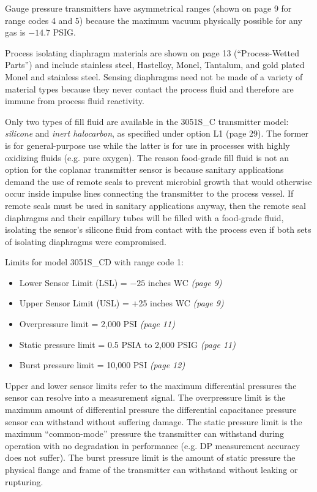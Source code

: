 \vskip 10pt

Gauge pressure transmitters have asymmetrical ranges (shown on page 9 for range codes 4 and 5) because the maximum vacuum physically possible for any gas is $-14.7$ PSIG.

\vskip 10pt

Process isolating diaphragm materials are shown on page 13 (``Process-Wetted Parts'') and include stainless steel, Hastelloy, Monel, Tantalum, and gold plated Monel and stainless steel.  Sensing diaphragms need not be made of a variety of material types because they never contact the process fluid and therefore are immune from process fluid reactivity.

\vskip 10pt

Only two types of fill fluid are available in the 3051S\_C transmitter model: {\it silicone} and {\it inert halocarbon}, as specified under option L1 (page 29).  The former is for general-purpose use while the latter is for use in processes with highly oxidizing fluids (e.g. pure oxygen).  The reason food-grade fill fluid is not an option for the coplanar transmitter sensor is because sanitary applications demand the use of remote seals to prevent microbial growth that would otherwise occur inside impulse lines connecting the transmitter to the process vessel.  If remote seals must be used in sanitary applications anyway, then the remote seal diaphragms and their capillary tubes will be filled with a food-grade fluid, isolating the sensor's silicone fluid from contact with the process even if both sets of isolating diaphragms were compromised.

\vskip 10pt

Limits for model 3051S\_CD with range code 1:

\begin{itemize}
\item{} Lower Sensor Limit (LSL) = $-25$ inches WC {\it (page 9)}
\item{} Upper Sensor Limit (USL) = +25 inches WC {\it (page 9)}
\item{} Overpressure limit = 2,000 PSI {\it (page 11)}
\item{} Static pressure limit = 0.5 PSIA to 2,000 PSIG {\it (page 11)} 
\item{} Burst pressure limit = 10,000 PSI {\it (page 12)} 
\end{itemize}

Upper and lower sensor limits refer to the maximum differential pressures the sensor can resolve into a measurement signal.  The overpressure limit is the maximum amount of differential pressure the differential capacitance pressure sensor can withstand without suffering damage.  The static pressure limit is the maximum ``common-mode'' pressure the transmitter can withstand during operation with no degradation in performance (e.g. DP measurement accuracy does not suffer).  The burst pressure limit is the amount of static pressure the physical flange and frame of the transmitter can withstand without leaking or rupturing.




